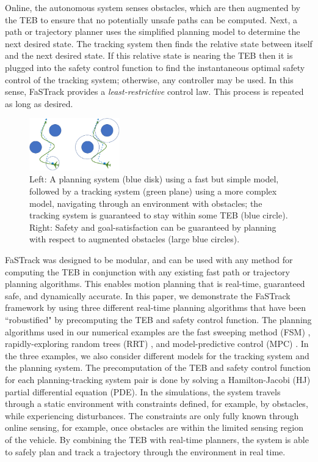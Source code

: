 Online, the autonomous system senses obstacles, which are then augmented by the TEB to ensure that no potentially unsafe paths can be computed. 
Next, a path or trajectory planner uses the simplified planning model to determine the next desired state. 
The tracking system then finds the relative state between itself and the next desired state. 
If this relative state is nearing the TEB then it is plugged into the safety control function to find the instantaneous optimal safety control of the tracking system; otherwise, any controller may be used. In this sense, FaSTrack provides a \emph{least-restrictive} control law. 
This process is repeated as long as desired. 
  
\begin{figure}
	\centering
	\includegraphics[width=0.35\textwidth]{fig/chasing}
	\caption{Left: A planning system (blue disk) using a fast but simple model, followed by a tracking system (green plane) using a more complex model, navigating through an environment with obstacles; the tracking system is guaranteed to stay within some TEB (blue circle). Right: Safety and goal-satisfaction can be guaranteed by planning with respect to augmented obstacles (large blue circles).}
	\label{fig:chasing}
\end{figure}
%

FaSTrack was designed to be modular, and can be used with any method for computing the TEB in conjunction with any existing fast path or trajectory planning algorithms.  
This enables motion planning that is real-time, guaranteed safe, and dynamically accurate. 
In this paper, we demonstrate the FaSTrack framework by using three different real-time planning algorithms that have been ``robustified" by precomputing the TEB and safety control function. 
The planning algorithms used in our numerical examples are the fast sweeping method (FSM) \cite{Takei2013}, rapidly-exploring random trees (RRT) \cite{Kuffner2000,Kavraki1996}, and model-predictive control (MPC) \cite{Qin2003}. 
In the three examples, we also consider different models for the tracking system and the planning system.
The precomputation of the TEB and safety control function for each planning-tracking system pair is done by solving a Hamilton-Jacobi (HJ) partial differential equation (PDE). 
In the simulations, the system travels through a static environment with constraints defined, for example, by obstacles, while experiencing disturbances.
The constraints are only fully known through online sensing, for example, once obstacles are within the limited sensing region of the vehicle. 
By combining the TEB with real-time planners, the system is able to safely plan and track a trajectory through the environment in real time. 
